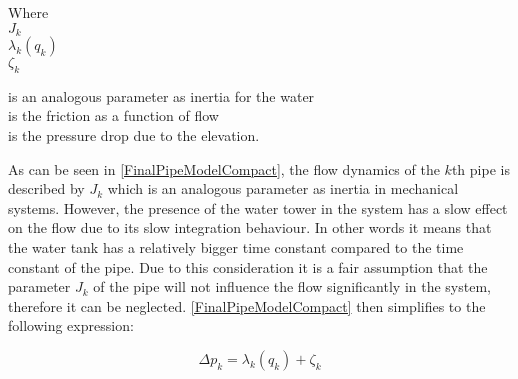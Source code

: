 \begin{minipage}[t]{0.20\textwidth}
Where\\
\hspace*{8mm} $J_k$ \\
\hspace*{8mm} $\lambda_k(q_k)$ \\
\hspace*{8mm} $\zeta_k$ 
\end{minipage}
\begin{minipage}[t]{0.68\textwidth}
\vspace*{2mm}
is an analogous parameter as inertia for the water\\ 
is the friction as a function of flow\\
is the pressure drop due to the elevation.
\end{minipage}

As can be seen in \eqref{FinalPipeModelCompact}, the flow dynamics of the $k$th pipe is described by $J_k$ which is an analogous parameter as inertia in mechanical systems. However, the presence of the water tower in the system has a slow effect on the flow due to its slow integration behaviour. In other words it means that the water tank has a relatively bigger time constant compared to the time constant of the pipe. Due to this consideration it is a fair assumption that the parameter $J_k$ of the pipe will not influence the flow significantly in the system, therefore it can be neglected. \eqref{FinalPipeModelCompact} then simplifies to the following expression: 
  
\begin{equation}
\label{FinalPipeModelSimplified}
  \Delta p_k  =   \lambda_k(q_k) + \zeta_k 
\end{equation}


